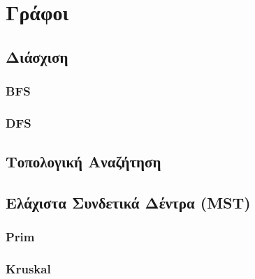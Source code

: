 \documentclass[a4paper,12pt]{article}
\begin{document}
\newpage
\section{Γράφοι}
\subsection{Διάσχιση}
\subsubsection{BFS}
\subsubsection{DFS}
\subsection{Τοπολογική Αναζήτηση}
\subsection{Ελάχιστα Συνδετικά Δέντρα (MST)}
\subsubsection{Prim}
\subsubsection{Kruskal}
\end{document}

